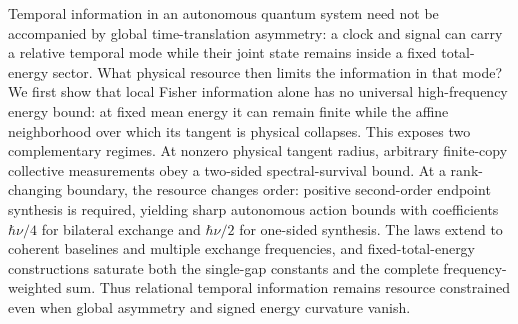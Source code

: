 Temporal information in an autonomous quantum system need not be accompanied by global time-translation asymmetry: a clock and signal can carry a relative temporal mode while their joint state remains inside a fixed total-energy sector. What physical resource then limits the information in that mode? We first show that local Fisher information alone has no universal high-frequency energy bound: at fixed mean energy it can remain finite while the affine neighborhood over which its tangent is physical collapses. This exposes two complementary regimes. At nonzero physical tangent radius, arbitrary finite-copy collective measurements obey a two-sided spectral-survival bound. At a rank-changing boundary, the resource changes order: positive second-order endpoint synthesis is required, yielding sharp autonomous action bounds with coefficients $\hbar\nu/4$ for bilateral exchange and $\hbar\nu/2$ for one-sided synthesis. The laws extend to coherent baselines and multiple exchange frequencies, and fixed-total-energy constructions saturate both the single-gap constants and the complete frequency-weighted sum. Thus relational temporal information remains resource constrained even when global asymmetry and signed energy curvature vanish.
